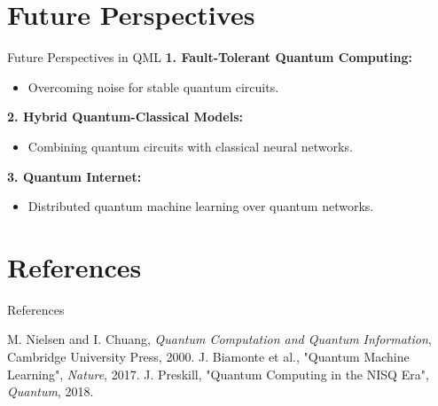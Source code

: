 \documentclass{beamer}
\begin{document}
\section{Future Perspectives}
\begin{frame}{Future Perspectives in QML}
\textbf{1. Fault-Tolerant Quantum Computing:}
\begin{itemize}
    \item Overcoming noise for stable quantum circuits.
\end{itemize}

\textbf{2. Hybrid Quantum-Classical Models:}
\begin{itemize}
    \item Combining quantum circuits with classical neural networks.
\end{itemize}

\textbf{3. Quantum Internet:}
\begin{itemize}
    \item Distributed quantum machine learning over quantum networks.
\end{itemize}
\end{frame}

\section{References}
\begin{frame}{References}
\begin{thebibliography}{9}
 M. Nielsen and I. Chuang, \textit{Quantum Computation and Quantum Information}, Cambridge University Press, 2000.
 J. Biamonte et al., "Quantum Machine Learning", \textit{Nature}, 2017.
 J. Preskill, "Quantum Computing in the NISQ Era", \textit{Quantum}, 2018.
\end{thebibliography}
\end{frame}
\end{document}
